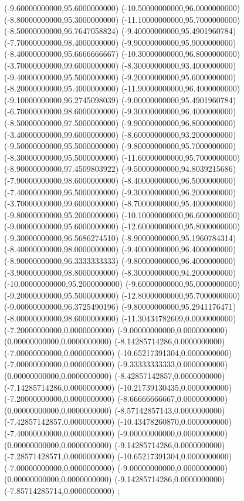 {(-9.60000000000,95.6000000000)
(-10.50000000000,96.0000000000)
(-8.80000000000,95.3000000000)
(-11.10000000000,95.7000000000)
(-8.50000000000,96.7647058824)
(-9.40000000000,95.4901960784)
(-7.70000000000,98.4000000000)
(-9.90000000000,95.9000000000)
(-8.40000000000,95.6666666667)
(-10.30000000000,96.8000000000)
(-3.70000000000,99.6000000000)
(-8.30000000000,93.4000000000)
(-9.40000000000,95.5000000000)
(-9.20000000000,95.6000000000)
(-8.20000000000,95.4000000000)
(-11.90000000000,96.4000000000)
(-9.10000000000,96.2745098039)
(-9.00000000000,95.4901960784)
(-6.70000000000,98.6000000000)
(-9.30000000000,96.4000000000)
(-8.50000000000,97.5000000000)
(-9.90000000000,96.8000000000)
(-3.40000000000,99.6000000000)
(-8.60000000000,93.2000000000)
(-9.50000000000,95.5000000000)
(-9.80000000000,95.7000000000)
(-8.30000000000,95.5000000000)
(-11.60000000000,95.7000000000)
(-8.90000000000,97.4509803922)
(-9.50000000000,94.8039215686)
(-7.90000000000,98.6000000000)
(-8.40000000000,96.5000000000)
(-7.40000000000,96.5000000000)
(-9.30000000000,96.2000000000)
(-3.70000000000,99.6000000000)
(-8.70000000000,95.4000000000)
(-9.80000000000,95.2000000000)
(-10.10000000000,96.6000000000)
(-9.00000000000,95.6000000000)
(-12.60000000000,95.8000000000)
(-9.30000000000,96.5686274510)
(-8.90000000000,95.1960784314)
(-8.40000000000,98.0000000000)
(-9.40000000000,96.4000000000)
(-8.90000000000,96.3333333333)
(-9.80000000000,96.4000000000)
(-3.90000000000,98.8000000000)
(-8.30000000000,94.2000000000)
(-10.00000000000,95.2000000000)
(-9.60000000000,95.0000000000)
(-9.20000000000,95.5000000000)
(-12.80000000000,95.7000000000)
(-9.00000000000,96.3725490196)
(-9.80000000000,95.2941176471)
(-8.00000000000,98.6000000000)
(-11.30434782609,0.0000000000)
(-7.20000000000,0.0000000000)
(-9.00000000000,0.0000000000)
(0.00000000000,0.0000000000)
(-8.14285714286,0.0000000000)
(-7.00000000000,0.0000000000)
(-10.65217391304,0.0000000000)
(-7.00000000000,0.0000000000)
(-9.33333333333,0.0000000000)
(0.00000000000,0.0000000000)
(-8.42857142857,0.0000000000)
(-7.14285714286,0.0000000000)
(-10.21739130435,0.0000000000)
(-7.20000000000,0.0000000000)
(-8.66666666667,0.0000000000)
(0.00000000000,0.0000000000)
(-8.57142857143,0.0000000000)
(-7.42857142857,0.0000000000)
(-10.43478260870,0.0000000000)
(-7.40000000000,0.0000000000)
(-9.00000000000,0.0000000000)
(0.00000000000,0.0000000000)
(-9.14285714286,0.0000000000)
(-7.28571428571,0.0000000000)
(-10.65217391304,0.0000000000)
(-7.00000000000,0.0000000000)
(-9.00000000000,0.0000000000)
(0.00000000000,0.0000000000)
(-9.14285714286,0.0000000000)
(-7.85714285714,0.0000000000)
};
